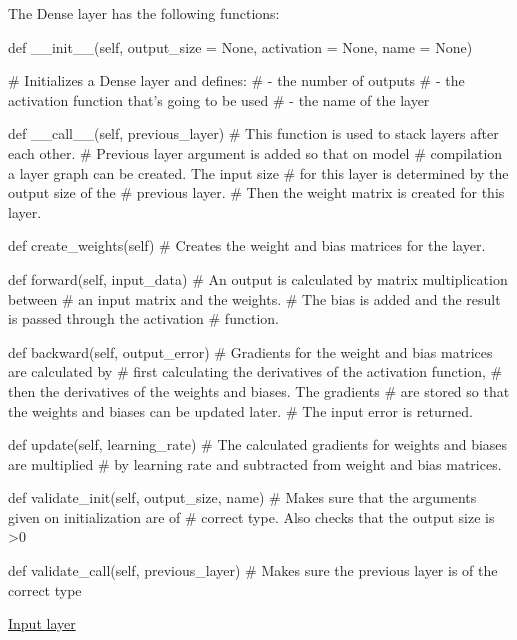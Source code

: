 \documentclass{article}
\begin{document}
    The Dense layer has the following functions:
\begin{python}
def __init__(self,
             output_size = None,
             activation  = None,
             name        = None)

# Initializes a Dense layer and defines:
#       - the number of outputs
#       - the activation function that's going to be used
#       - the name of the layer
\end{python}
\begin{python}
def __call__(self,
             previous_layer)
# This function is used to stack layers after each other.
# Previous layer argument is added so that on model 
# compilation a layer graph can be created. The input size 
# for this layer is determined by the output size of the 
# previous layer.
# Then the weight matrix is created for this layer.
\end{python}
\begin{python}
def create_weights(self)
# Creates the weight and bias matrices for the layer.
\end{python}
\begin{python}
def forward(self,
            input_data)
# An output is calculated by matrix multiplication between
# an input matrix  and the weights.
# The bias is added and the result is passed through the activation 
# function.
\end{python}
\begin{python}
def backward(self,
             output_error)
# Gradients for the weight and bias matrices are calculated by
# first calculating the derivatives of the activation function,
# then the derivatives of the weights and biases. The gradients 
# are stored so that the weights and biases can be updated later.
# The input error is returned.
\end{python}
\begin{python}
def update(self,
           learning_rate)
# The calculated gradients for weights and biases are multiplied
# by learning rate and subtracted from weight and bias matrices.
\end{python}
\pagebreak
\begin{python}
def validate_init(self,
                  output_size,
                  name)
# Makes sure that the arguments given on initialization are of 
# correct type. Also checks that the output size is >0
\end{python}
\begin{python}
def validate_call(self,
                  previous_layer)
# Makes sure the previous layer is of the correct type                
\end{python}
\clearpage
\hypertarget{input_layer}{\underline{Input layer}} \\
\end{document}
